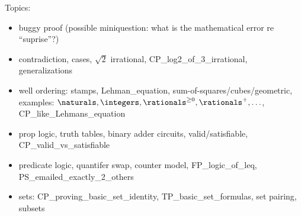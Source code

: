 \documentclass[quiz]{mcs}
\begin{document}


\examspace

\begin{staffnotes}
Topics:
\begin{itemize}
\item buggy proof (possible miniquestion: what is the mathematical error re ``suprise''?)

\item contradiction, cases, $\sqrt{2}$ irrational, CP\_log2\_of\_3\_irrational, generalizations

\item well ordering: stamps, Lehman\_equation,
  sum-of-squares/cubes/geometric, examples: $\naturals, \integers,
  \rationals^{\geq 0}, \rationals^{+}, \ldots$, CP\_like\_Lehmans\_equation

\item prop logic, truth tables, binary adder circuits, valid/satisfiable, CP\_valid\_vs\_satisfiable

\item predicate logic, quantifer swap, counter model, FP\_logic\_of\_leq, PS\_emailed\_exactly\_2\_others

\item sets: CP\_proving\_basic\_set\_identity, TP\_basic\_set\_formulas, set pairing, subsets
\end{itemize}
\end{staffnotes}




\end{document}

